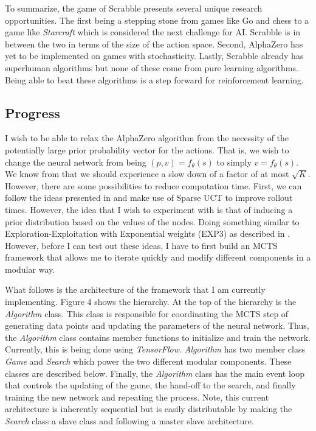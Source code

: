 \documentclass{article}
\begin{document}
  To summarize, the game of Scrabble presents several unique research opportunities. The first being a stepping stone from games like Go and chess to a game like \textit{Starcraft} which is considered the next challenge for AI. Scrabble is in between the two in terms of the size of the action space. Second, AlphaZero has yet to be implemented on games with stochasticity. Lastly, Scrabble already has superhuman algorithms but none of these come from pure learning algorithms. Being able to beat these algorithms is a step forward for reinforcement learning.


  \subsection{Progress}

  I wish to be able to relax the AlphaZero algorithm from the necessity of the potentially large prior probability vector for the actions. That is, we wish to change the neural network from being $(p,v) = f_{\theta}(s)$ to simply $v = f_{\theta}(s)$. We know from \cite{rosin_multi-armed_2011} that we should experience a slow down of a factor of at most $\sqrt{K}$. However, there are some possibilities to reduce computation time. First, we can follow the ideas presented in \cite{bjarnason_lower_2009} and make use of Sparse UCT to improve rollout times. However, the idea that I wish to experiment with is that of inducing a prior distribution based on the values of the nodes. Doing something similar to Exploration-Exploitation with Exponential weights (EXP3) as described in \cite{audibert_minimax_2009}. However, before I can test out these ideas, I have to first build an MCTS framework that allows me to iterate quickly and modify different components in a modular way.

  What follows is the architecture of the framework that I am currently implementing. Figure 4 shows the hierarchy. At the top of the hierarchy is the \textit{Algorithm} class. This class is responsible for coordinating the MCTS step of generating data points and updating the parameters of the neural network. Thus, the \textit{Algorithm} class contains member functions to initialize and train the network. Currently, this is being done using \textit{TensorFlow}. \textit{Algorithm} has two member class \textit{Game} and \textit{Search} which power the two different modular components. These classes are described below. Finally, the \textit{Algorithm} class has the main event loop that controls the updating of the game, the hand-off to the search, and finally training the new network and repeating the process. Note, this current architecture is inherently sequential but is easily distributable by making the \textit{Search} class a slave class and following a master slave architecture.
\end{document}
